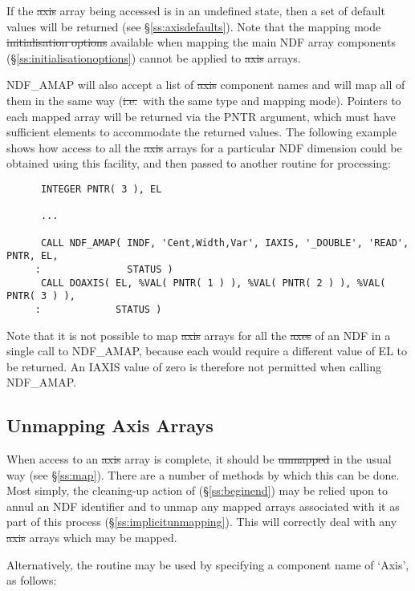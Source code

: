 If the \st{axis\/} array being accessed is in an undefined state, then a
set of default values will be returned (see \S\ref{ss:axisdefaults}).
Note that the mapping mode \st{initialisation options\/} available when
mapping the main NDF array components (\S\ref{ss:initialisationoptions})
cannot be applied to \st{axis\/} arrays. 

NDF\_AMAP will also accept a list of \st{axis\/} component names and will
map all of them in the same way (\st{i.e.}\ with the same type and mapping
mode). 
Pointers to each mapped array will be returned via the PNTR argument, which
must have sufficient elements to accommodate the returned values. 
The following example shows how access to all the \st{axis\/} arrays for a
particular NDF dimension could be obtained using this facility, and then
passed to another routine for processing: 

\small
\begin{verbatim}
      INTEGER PNTR( 3 ), EL

      ...

      CALL NDF_AMAP( INDF, 'Cent,Width,Var', IAXIS, '_DOUBLE', 'READ', PNTR, EL,
     :               STATUS )
      CALL DOAXIS( EL, %VAL( PNTR( 1 ) ), %VAL( PNTR( 2 ) ), %VAL( PNTR( 3 ) ),
     :             STATUS )
\end{verbatim}
\normalsize

Note that it is not possible to map \st{axis\/} arrays for all the
\st{axes\/} of an NDF in a single call to NDF\_AMAP, because each
would require 
a different value of EL to be returned. 
An IAXIS value of zero is therefore not permitted when calling NDF\_AMAP. 

\subsection{Unmapping Axis Arrays}

When access to an \st{axis\/} array is complete, it should be
\st{unmapped\/} in the usual way (see \S\ref{ss:map}). There are a
number 
of methods by which this can be done.
Most simply, the cleaning-up action of  (\S\ref{ss:beginend}) may be
relied upon to annul an NDF identifier and to unmap any mapped arrays
associated with it as part of this process (\S\ref{ss:implicitunmapping}). 
This will correctly deal with any \st{axis\/} arrays which may be mapped. 

Alternatively, the routine  may be used by specifying a component
name of `Axis', as follows: 

